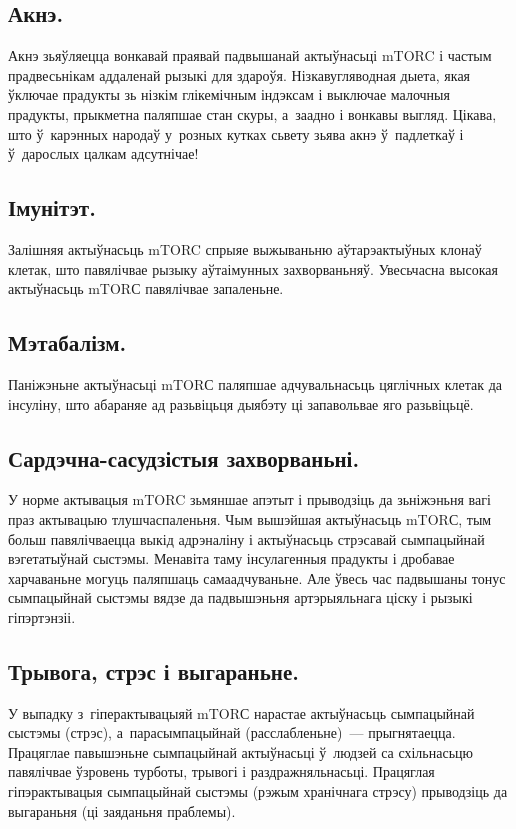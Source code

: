 \subsection{Акнэ.}
Акнэ зьяўляецца вонкавай праявай падвышанай актыўнасьці mTORC і частым прадвесьнікам аддаленай рызыкі для здароўя. Нізкавугляводная дыета, якая ўключае прадукты зь нізкім глікемічным індэксам і выключае малочныя прадукты, прыкметна паляпшае стан скуры, а~заадно і вонкавы выгляд. Цікава, што ў~карэнных народаў у~розных кутках сьвету зьява акнэ ў~падлеткаў і ў~дарослых цалкам адсутнічае!

\subsection{Імунітэт.}
Залішняя актыўнасьць mTORC спрыяе выжываньню аўтарэактыўных клонаў клетак, што павялічвае рызыку аўтаімунных захворваньняў. Увесьчасна высокая актыўнасьць mTORС павялічвае запаленьне.

\subsection{Мэтабалізм.}
Паніжэньне актыўнасьці mTORС паляпшае адчувальнасьць цяглічных клетак да інсуліну, што абараняе ад разьвіцьця дыябэту ці запавольвае яго разьвіцьцё.


\subsection{Сардэчна-сасудзістыя захворваньні.}
У норме актывацыя mTORC зьмяншае апэтыт і прыводзіць да зьніжэньня вагі праз актывацыю тлушчаспаленьня. Чым вышэйшая актыўнасьць mTORС, тым больш павялічваецца выкід адрэналіну і актыўнасьць стрэсавай сымпацыйнай вэгетатыўнай сыстэмы. Менавіта таму інсулагенныя прадукты і дробавае харчаваньне могуць паляпшаць самаадчуваньне. Але ўвесь час падвышаны тонус сымпацыйнай сыстэмы вядзе да падвышэньня артэрыяльнага ціску і рызыкі гіпэртэнзіі.

\subsection{Трывога, стрэс і выгараньне.}
У выпадку з~гіперактывацыяй mTORС нарастае актыўнасьць сымпацыйнай сыстэмы (стрэс), а~парасымпацыйнай (расслабленьне)~--- прыгнятаецца. Працяглае павышэньне сымпацыйнай актыўнасьці ў~людзей са схільнасьцю павялічвае ўзровень турботы, трывогі і раздражняльнасьці. Працяглая гіпэрактывацыя сымпацыйнай сыстэмы (рэжым хранічнага стрэсу) прыводзіць да выгараньня (ці заяданьня праблемы).

